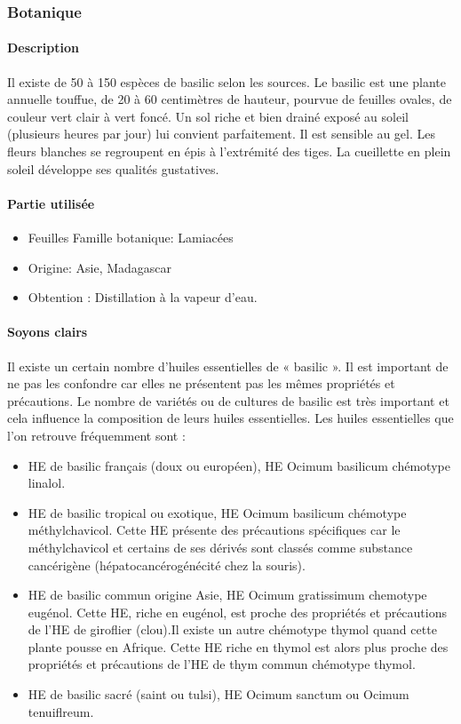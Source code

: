 \documentclass[12pt,a4wide]{article}
\begin{document}
\subsubsection{Botanique}
\label{sec-4-4-2}

\paragraph{Description}
\label{sec-4-4-2-1}
Il existe de 50  à 150 espèces de basilic selon les sources.  Le basilic est une
plante annuelle touffue, de 20 à  60 centimètres de hauteur, pourvue de feuilles
ovales, de couleur vert  clair à vert foncé. Un sol riche  et bien drainé exposé
au soleil (plusieurs heures par jour) lui convient parfaitement. Il est sensible
au gel. Les  fleurs blanches se regroupent  en épis à l'extrémité  des tiges. La
cueillette en plein soleil développe ses qualités gustatives.

\paragraph{Partie utilisée}
\label{sec-4-4-2-2}
\begin{itemize}
\item Feuilles Famille botanique: Lamiacées
\item Origine: Asie, Madagascar
\item Obtention : Distillation à la vapeur d'eau.
\end{itemize}

\paragraph{Soyons clairs}
\label{sec-4-4-2-3}
Il  existe un  certain  nombre d'huiles  essentielles  de «  basilic  ». Il  est
important  de  ne pas  les  confondre  car elles  ne  présentent  pas les  mêmes
propriétés et précautions.  Le nombre de  variétés ou de cultures de basilic est
très important  et cela influence  la composition de leurs  huiles essentielles.
Les huiles essentielles que l'on retrouve fréquemment sont :
\begin{itemize}
\item HE de basilic français (doux ou européen), HE Ocimum basilicum chémotype linalol.
\item HE  de  basilic  tropical  ou  exotique,  HE  Ocimum  basilicum  chémotype
méthylchavicol.  Cette  HE présente  des  précautions  spécifiques car  le
méthylchavicol et  certains de  ses dérivés  sont classés  comme substance
cancérigène (hépatocancérogénécité chez la souris).
\item HE  de  basilic  commun  origine Asie,  HE  Ocimum  gratissimum  chemotype
eugénol.  Cette  HE,  riche  en  eugénol, est  proche  des  propriétés  et
précautions  de l'HE  de  giroflier (clou).Il  existe  un autre  chémotype
thymol quand cette plante  pousse en  Afrique. Cette HE riche en thymol est
alors plus  proche des propriétés  et précautions  de l'HE de  thym commun
chémotype thymol.
\item HE de basilic sacré (saint ou tulsi), HE Ocimum sanctum ou Ocimum tenuiflreum.
\end{itemize}
\end{document}
